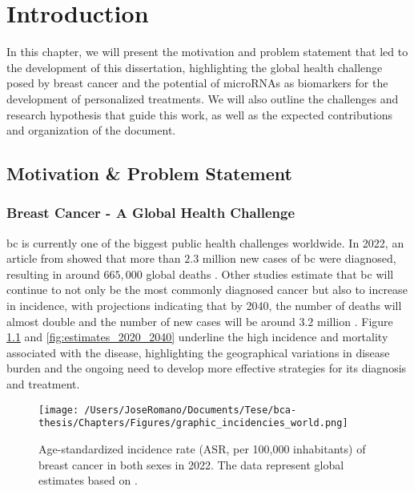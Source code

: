 
%

\chapter{Introduction}
\label{cha:introduction}

In this chapter, we will present the motivation and problem statement that led
to the development of this dissertation, highlighting the global health
challenge posed by breast cancer and the potential of microRNAs as biomarkers
for the development of personalized treatments. We will also outline the
challenges and research hypothesis that guide this work, as well as the
expected contributions and organization of the document.

\section{Motivation \& Problem Statement}
\label{sec:motivation+problem-statement}
\subsection{Breast Cancer - A Global Health Challenge}

\gls{bc} is currently one of the biggest public health challenges worldwide. In
2022, an article from \textcite{bcaData2024_bray} showed that more than $2.3$
million new cases of \gls{bc} were diagnosed, resulting in
around $665,\!000$ global deaths . Other studies
estimate that \gls{bc} will continue to not only be the most commonly diagnosed
cancer but also to increase in incidence, with projections indicating that by
2040, the number of deaths will almost double and the number of new cases will
be around $3.2$ million \cite{bca_data_Arnold2022Current}. Figure
\ref{fig:graphic_incidencies_world} and \ref{fig:estimates_2020_2040}
underline the high incidence and mortality associated with the disease,
highlighting the geographical variations in disease burden and the ongoing need
to develop more effective strategies for its diagnosis and treatment.

\begin{figure}[h!]
  \centering
  \texttt{[image: /Users/JoseRomano/Documents/Tese/bca-thesis/Chapters/Figures/graphic\_incidencies\_world.png]}
  \caption{Age-standardized incidence rate (ASR, per 100,000 inhabitants) of breast cancer in both sexes in 2022.
    The data represent global estimates based on \textcite{GLOBOCAN2022}.}
  \label{fig:graphic_incidencies_world}
\end{figure}

